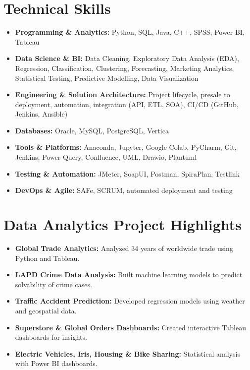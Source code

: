 \documentclass[a4paper,10pt]{article}
\begin{document}
\section*{\textcolor{myblue}{Technical Skills}}
\begin{itemize}
    \item \textbf{Programming \& Analytics:} Python, SQL, Java, C++, SPSS, Power BI, Tableau
    \item \textbf{Data Science \& BI:} Data Cleaning, Exploratory Data Analysis (EDA), Regression, Classification, Clustering, Forecasting, Marketing Analytics, Statistical Testing, Predictive Modelling, Data Visualization
    \item \textbf{Engineering \& Solution Architecture:} Project lifecycle, presale to deployment, automation, integration (API, ETL, SOA), CI/CD (GitHub, Jenkins, Ansible)
    \item \textbf{Databases:} Oracle, MySQL, PostgreSQL, Vertica
    \item \textbf{Tools \& Platforms:} Anaconda, Jupyter, Google Colab, PyCharm, Git, Jenkins, Power Query, Confluence, UML, Drawio, Plantuml
    \item \textbf{Testing \& Automation:} JMeter, SoapUI, Postman, SpiraPlan, Testlink
    \item \textbf{DevOps \& Agile:} SAFe, SCRUM, automated deployment and testing
\end{itemize}

\section*{\textcolor{myblue}{Data Analytics Project Highlights}}
\begin{itemize}
    \item \textbf{Global Trade Analytics:} Analyzed 34 years of worldwide trade using Python and Tableau.
    \item \textbf{LAPD Crime Data Analysis:} Built machine learning models to predict solvability of crime cases.
    \item \textbf{Traffic Accident Prediction:} Developed regression models using weather and geospatial data.
    \item \textbf{Superstore \& Global Orders Dashboards:} Created interactive Tableau dashboards for insights.
    \item \textbf{Electric Vehicles, Iris, Housing \& Bike Sharing:} Statistical analysis with Power BI dashboards.
\end{itemize}
\end{document}
